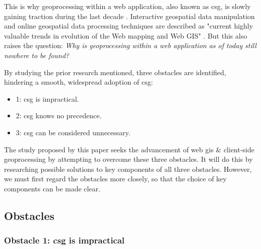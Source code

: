 This is why \ac{geoprocessing} within a web application, also known as \ac{csg}, is slowly gaining traction during the last decade \cite{kulawiak_analysis_2019, panidi_hybrid_2015, hamilton_client-side_2014}. Interactive geospatial data manipulation and online geospatial data processing techniques are described as "current highly valuable trends in evolution of the Web mapping and Web GIS" \cite{panidi_hybrid_2015}. But this also raises the question: \textit{Why is geoprocessing within a web application as of today still nowhere to be found?} 

By studying the prior research mentioned, three obstacles are identified, hindering a smooth, widespread adoption of \ac{csg}: 
\begin{itemize}
  \item 1: \ac{csg} is impractical.
  \item 2: \ac{csg} knows no precedence.
  \item 3: \ac{csg} can be considered unnecessary.
\end{itemize}

The study proposed by this paper seeks the advancement of web \ac{gis} \& client-side geoprocessing by attempting to overcome these three obstacles. It will do this by researching possible solutions to key components of all three obstacles. However, we must first regard the obstacles more closely, so that the choice of key components can be made clear. 

\newpage
\subsection{Obstacles}
\subsubsection*{Obstacle 1: \ac{csg} is impractical}

